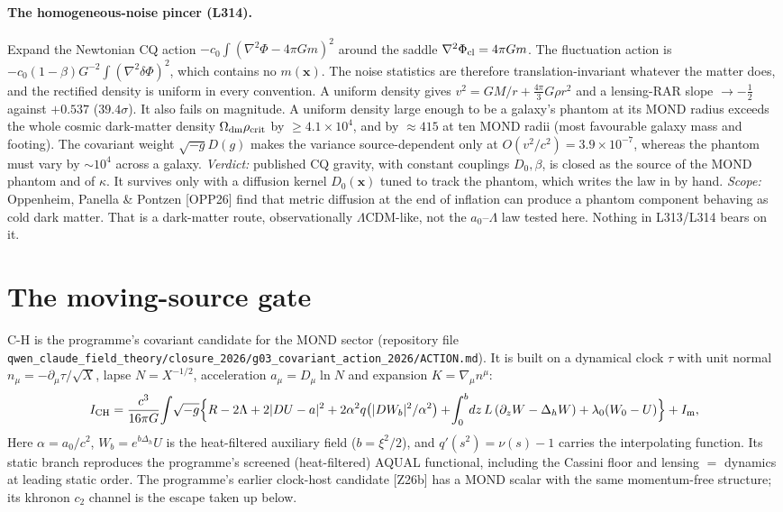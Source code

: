 \documentclass[10pt]{article}
\newcommand{\fpath}[1]{\nolinkurl{#1}}
\begin{document}
\paragraph{The homogeneous-noise pincer (L314).}
Expand the Newtonian CQ action $-c_0\!\int(\nabla^2\Phi-4\pi Gm)^2$ around the saddle $\nabla^2\Phi_{\rm cl}=4\pi Gm$. The fluctuation action is $-c_0(1-\beta)G^{-2}\!\int(\nabla^2\delta\Phi)^2$, which contains no $m(\mathbf x)$. The noise statistics are therefore translation-invariant whatever the matter does, and the rectified density is uniform in every convention.
A uniform density gives $v^2=GM/r+\tfrac{4\pi}{3}G\rho r^2$ and a lensing-RAR slope $\to-\tfrac12$ against $+0.537$ ($39.4\sigma$).
It also fails on magnitude. A uniform density large enough to be a galaxy's phantom at its MOND radius exceeds the whole cosmic dark-matter density $\Omega_{\rm dm}\rho_{\rm crit}$ by $\geq4.1\times10^4$, and by $\approx415$ at ten MOND radii (most favourable galaxy mass and footing).
The covariant weight $\sqrt{-g}D(g)$ makes the variance source-dependent only at $O(v^2/c^2)=3.9\times10^{-7}$, whereas the phantom must vary by $\sim\!10^4$ across a galaxy.
\emph{Verdict:} published CQ gravity, with constant couplings $D_0,\beta$, is closed as the source of the MOND phantom and of $\kappa$. It survives only with a diffusion kernel $D_0(\mathbf x)$ tuned to track the phantom, which writes the law in by hand.
\emph{Scope:} Oppenheim, Panella \& Pontzen [OPP26] find that metric diffusion at the end of inflation can produce a phantom component behaving as cold dark matter. That is a dark-matter route, observationally $\Lambda$CDM-like, not the $a_0$--$\Lambda$ law tested here. Nothing in L313/L314 bears on it.

\section{The moving-source gate}\label{sec:gate}

C-H is the programme's covariant candidate for the MOND sector (repository file \fpath{qwen_claude_field_theory/closure_2026/g03_covariant_action_2026/ACTION.md}). It is built on a dynamical clock $\tau$ with unit normal $n_\mu=-\partial_\mu\tau/\sqrt X$, lapse $N=X^{-1/2}$, acceleration $a_\mu=D_\mu\ln N$ and expansion $K=\nabla_\mu n^\mu$:
\begin{equation}
I_{\rm CH}=\frac{c^3}{16\pi G}\!\int\!\sqrt{-g}\Big\{R-2\Lambda+2|DU-a|^2+2\alpha^2q\big(|DW_b|^2/\alpha^2\big)+\!\int_0^b\!dz\,L\,(\partial_zW-\Delta_hW)+\lambda_0(W_0-U)\Big\}+I_{\rm m},
\end{equation}
Here $\alpha=a_0/c^2$, $W_b=e^{b\Delta_h}U$ is the heat-filtered auxiliary field ($b=\xi^2/2$), and $q'(s^2)=\nu(s)-1$ carries the interpolating function. Its static branch reproduces the programme's screened (heat-filtered) AQUAL functional, including the Cassini floor and lensing $=$ dynamics at leading static order. The programme's earlier clock-host candidate [Z26b] has a MOND scalar with the same momentum-free structure; its khronon $c_2$ channel is the escape taken up below.
\end{document}
